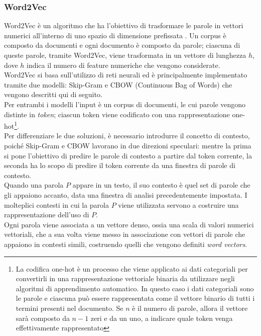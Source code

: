 \documentclass[12pt]{report}
\theoremstyle{definition}
\begin{document}
\subsubsection{Word2Vec} \label{w2v}
Word2Vec è un algoritmo che ha l'obiettivo di trasformare le parole in vettori numerici all'interno di uno spazio  di dimensione prefissata \cite{3}.
Un corpus è composto da documenti e ogni documento è composto da parole; ciascuna di queste parole, tramite Word2Vec, viene trasformata in un vettore di lunghezza $h$, dove $h$ indica il numero di feature numeriche che vengono considerate. 
\\
Word2Vec si basa sull'utilizzo di reti neurali \cite{3} ed è principalmente implementato tramite due modelli: Skip-Gram e CBOW (Continuous Bag of Words) che vengono descritti qui di seguito.
\\
Per entrambi i modelli l'input è un corpus di documenti, le cui parole vengono distinte in \textit{token}; ciascun token viene codificato con una rappresentazione one-hot\footnote{La codifica one-hot è un processo che viene applicato ai dati categoriali per convertirli in una rappresentazione vettoriale binaria da utilizzare negli algoritmi di apprendimento automatico. In questo caso i dati categoriali sono le parole e ciascuna può essere rappresentata come il vettore binario di tutti i termini presenti nel documento. Se $n$ è il numero di parole, allora il vettore sarà composto da $n-1$ zeri e da un uno, a indicare quale token venga effettivamente rappresentato}.
\\
Per differenziare le due soluzioni, è necessario introdurre il concetto di contesto, poiché Skip-Gram e CBOW lavorano in due direzioni speculari:
mentre la prima si pone l'obiettivo di predire le parole di contesto a partire dal token corrente, la seconda ha lo scopo di predire il token corrente da una finestra di parole di contesto.
\\
Quando una parola $P$ appare in un testo, il suo contesto è quel set di parole che gli appaiono accanto, data una finestra di analisi precedentemente impostata. I molteplici contesti in cui la parola $P$ viene utilizzata servono a costruire una rappresentazione dell’uso di $P$.
\\
Ogni parola viene associata a un vettore denso, ossia una scala di valori numerici vettoriali, che a sua volta viene messo in associazione con vettori di parole che appaiono in contesti simili, costruendo quelli che vengono definiti \textit{word vectors}.
\end{document}
